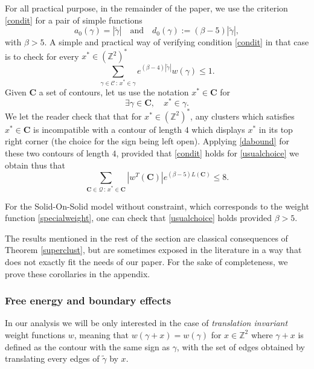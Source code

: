 \documentclass[JEP,XML,SOM,Unicode, NoFloatCountersInSection]{cedram}
\let\mathcal\mathscr
\newcommand{\sep}{\,:\,}
\numberwithin{equation}{section}
\theoremstyle{plain}
\theoremstyle{definition}
\newcommand{\cQ}{{\ensuremath{\mathcal Q}} }
\newcommand{\cC}{{\ensuremath{\mathcal C}} }
\newcommand{\bC}{{\ensuremath{\mathbf C}} }
\newcommand{\bbZ}{{\ensuremath{\mathbb Z}} }
\newcommand{\gb}{\beta}
\begin{document}
For all practical purpose, in the remainder of the paper, we use the criterion \eqref{condit} for a pair of simple functions\vspace*{-3pt}
\[
a_0(\gamma)=|\tilde \gamma| \quad\text{and}\quad d_0(\gamma):= \left(\gb-5\right) |\tilde \gamma|,
\]
with $\gb>5$.
A simple and practical way of verifying condition \eqref{condit} in that case is to check for every $x^*\in (\bbZ^2)^*$\vspace*{-3pt}
\begin{equation}\label{usualchoice}
\sum_{\gamma\in \cC \sep x^*\in \gamma} e^{(\gb-4)|\tilde \gamma|} w(\gamma)\le 1.
\end{equation}
Given $\bC$ a set of contours, let us use the notation $x^*\in \bC$ for
\begin{equation*}
\exists \gamma \in \bC, \quad x^*\in\gamma.
\end{equation*}
We let the reader check that
that for $x^*\in (\bbZ^2)^*$, any clusters which satisfies $x^*\in \bC$ is incompatible with a contour of length $4$ which displays $x^*$ in its top right corner
(the choice for the sign being left open).
Applying \eqref{dabound} for these two contours of length $4$, provided that \eqref{condit} holds for \eqref{usualchoice}
we obtain thus that
\begin{equation}\label{dabound2}
\sum_{ \bC\in \cQ \sep x^*\in \bC } |w^T(\bC)|e^{(\gb-5)L(\bC)} \le 8.
\end{equation}

For the Solid-On-Solid model without constraint, which corresponds to the weight function \eqref{specialweight},
one can check that
\eqref{usualchoice} holds provided $\gb>5$.

The results mentioned in the rest of the section are classical consequences of Theorem \ref{superclust},
but are sometimes exposed in the literature in a way that does not exactly fit the needs of our paper.
For the sake of completeness, we prove these corollaries in the appendix.

\subsubsection{Free energy and boundary effects}\label{fffa}
In our analysis we will be only interested in the case of \textit{translation invariant} weight functions $w$,
meaning that $w(\gamma+x)=w(\gamma)$ for $x\in \bbZ^2$ where $\gamma+x$ is defined as the contour with the same sign as $\gamma$,
with the set of edges obtained by translating every edges of
$\tilde\gamma$ by $x$.
\end{document}
